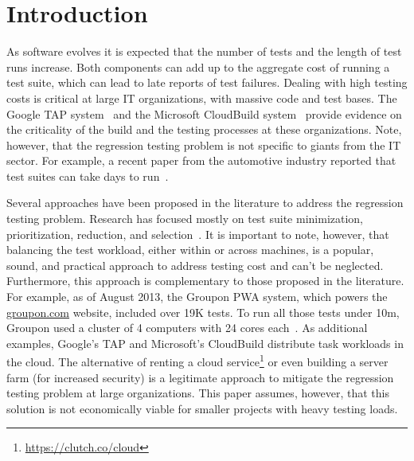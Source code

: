 \section{Introduction}


As software evolves it is expected that the number of tests and the
length of test runs increase.  Both components can add up to the
aggregate cost of running a test suite, which can lead to late reports
of test failures.  Dealing with high testing costs is critical at
large IT organizations, with massive code and test bases.  The Google
TAP system~\cite{google-tap,google-ci} and the Microsoft CloudBuild
system~\cite{prasad-shulte-ieee-microsoft-ci} provide evidence on the
criticality of the build and the testing processes at these
organizations.  Note, however, that the regression testing problem is
not specific to giants from the IT sector.  For example, a recent
paper from the automotive industry reported that test suites can take
days to run~\cite{artl-etal-icst2015}.

Several approaches have been proposed in the literature to address the
regression testing problem.  Research has focused mostly on test suite
minimization, prioritization, reduction, and
selection~\cite{yoo-harman-stvr2012}.  It is important to note,
however, that balancing the test workload, either within or across
machines, is a popular, sound, and practical approach to address
testing cost and can't be neglected.  Furthermore, this approach is
complementary to those proposed in the literature. For example, as of
August 2013, the Groupon PWA system, which powers the
\url{groupon.com} website, included over 19K tests.  To run all those
tests under 10m, Groupon used a cluster of 4 computers with 24 cores
each~\cite{kim-etal-fse2013}.  As additional examples, Google's TAP
and Microsoft's CloudBuild distribute task workloads in the cloud.
The alternative of renting a cloud
service\footnote{\url{https://clutch.co/cloud}} or even building a
server farm (for increased security) is a legitimate approach to
mitigate the regression testing problem at large organizations.  This
paper assumes, however, that this solution is not economically viable
for smaller projects with heavy testing loads.


